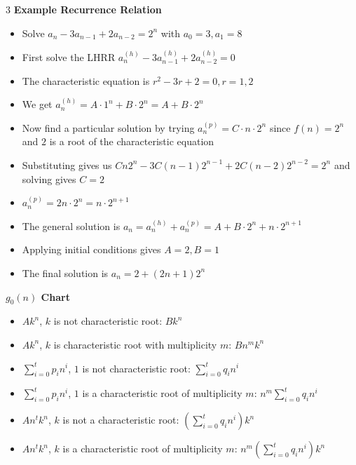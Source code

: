 \documentclass[10pt, landscape]{article}
\begin{document}
\begin{multicols*}{3}
\textbf{Example Recurrence Relation}
\begin{itemize}
    \item Solve $a_n-3a_{n-1}+2a_{n-2}=2^n$ with $a_0=3, a_1=8$
    \item First solve the LHRR $a_n^{(h)}-3a_{n-1}^{(h)}+2a_{n-2}^{(h)}=0$
    \item The characteristic equation is $r^2-3r+2=0, r=1,2$
    \item We get $a_n^{(h)}=A\cdot 1^n + B \cdot 2^n=A+B \cdot 2^n$
    \item Now find a particular solution by trying $a_n^{(p)}=C \cdot n \cdot 2^n$ since $f(n)=2^n$ and $2$ is a root of the characteristic equation
    \item Substituting gives us $Cn2^n-3C(n-1)2^{n-1}+2C(n-2)2^{n-2}=2^n$ and solving gives $C=2$
    \item $a_n^{(p)}=2n \cdot 2^n=n \cdot 2^{n+1}$
    \item The general solution is $a_n=a_n^{(h)}+a_n^{(p)}=A+B\cdot 2^n+n \cdot 2^{n+1}$
    \item Applying initial conditions gives $A=2, B=1$
    \item The final solution is $a_n=2+(2n+1)2^n$
\end{itemize}

\textbf{$g_0(n)$ Chart}
\begin{itemize}
    \item $Ak^n$, $k$ is not characteristic root: $Bk^n$
    \item $Ak^n$, $k$ is characteristic root with multiplicity $m$: $Bn^mk^n$
    \item $\sum_{i=0}^tp_in^i$, $1$ is not characteristic root: $\sum_{i=0}^tq_in^i$
    \item $\sum_{i=0}^tp_in^i$, $1$ is a characteristic root of multiplicity $m$: $n^m\sum_{i=0}^tq_in^i$
    \item $An^tk^n$, $k$ is not a characteristic root: $(\sum_{i=0}^tq_in^i)k^n$
    \item $An^tk^n$, $k$ is a characteristic root of multiplicity $m$: $n^m(\sum_{i=0}^tq_in^i)k^n$
\end{itemize}


\end{multicols*}
\end{document}
